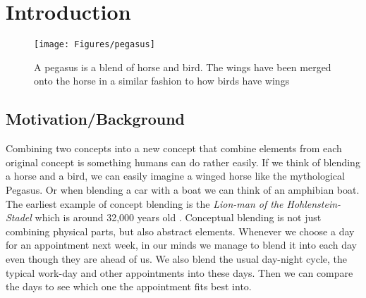 
\chapter{Introduction} %

\label{Chapter1} %


\newcommand{\keyword}[1]{\textbf{#1}}
\newcommand{\tabhead}[1]{\textbf{#1}}
\newcommand{\code}[1]{\texttt{#1}}
\newcommand{\file}[1]{\texttt{\bfseries#1}}
\newcommand{\option}[1]{\texttt{\itshape#1}}


\begin{figure}
\centering
\texttt{[image: Figures/pegasus]}
\caption{A pegasus is a blend of horse and bird. The wings have been merged onto the horse in a similar fashion to how birds have wings }
\label{fig:pegasus}
\end{figure}


\section{Motivation/Background}
Combining two concepts into a new concept that combine elements from each original concept is something humans can do rather easily.
If we think of blending a horse and a bird, we can easily imagine a winged horse like the mythological Pegasus.
Or when blending a car with a boat we can think of an amphibian boat.
The earliest example of concept blending is the \emph{Lion-man of the Hohlenstein-Stadel} which is around 32,000 years old \parencite{turner2014origin}.
Conceptual blending is not just combining physical parts, but also abstract elements.
Whenever we choose a day for an appointment next week, in our minds we manage to blend it into each day even though they are ahead of us.
We also blend the usual day-night cycle, the typical work-day and other appointments into these days.
Then we can compare the days to see which one the appointment fits best into. %

